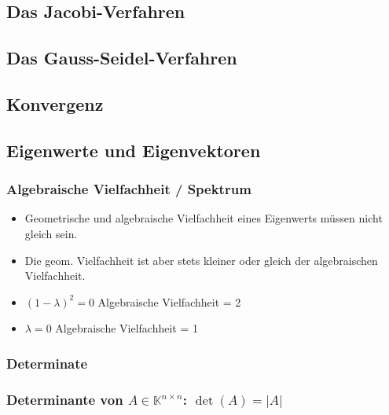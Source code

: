 \documentclass[8pt,a4paper]{scrartcl}
\begin{document}
\begin{multicols*}{3}
			\subsection{Das Jacobi-Verfahren}
			
			\subsection{Das Gauss-Seidel-Verfahren}
		
			\subsection{Konvergenz}
				
		\subsection{Eigenwerte und Eigenvektoren}
			\subsubsection{Algebraische Vielfachheit / Spektrum}
				\begin{itemize}\itemsep0pt				
					\item Geometrische und algebraische Vielfachheit eines Eigenwerts müssen nicht gleich sein. 
					\item Die geom. Vielfachheit ist aber stets kleiner oder gleich der algebraischen Vielfachheit.
					\item $(1-\lambda)^{2} = 0$ \qquad Algebraische Vielfachheit = 2
					\item $\lambda = 0$ \qquad \qquad \qquad Algebraische Vielfachheit = 1
				\end{itemize}
			\subsubsection{Determinate}
			
			\subsubsection{Determinante von $A\in \mathbb K^{n\times n}$: $\det(A)=|A|$}


\end{multicols*}
\end{document}
